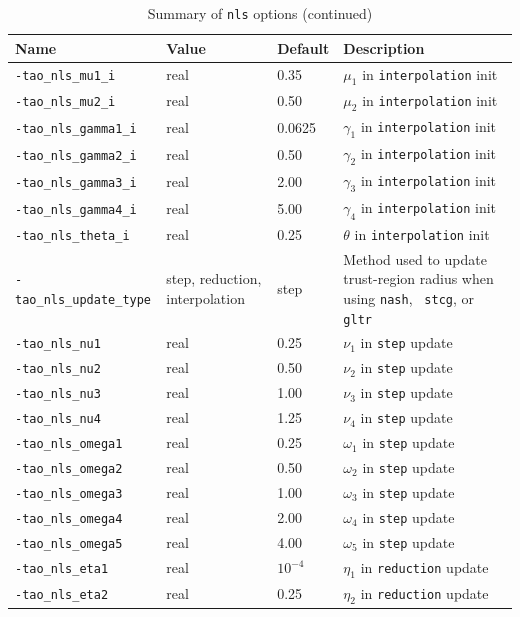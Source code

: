 \documentclass[]{book}
\begin{document}
\begin{table}[h]
\caption{Summary of {\tt nls} options (continued)}
\vspace{5mm}
\begin{tabular}{l|p{1.5in}|l|p{2.0in}}
\hline
Name \rule{0pt}{2.6ex} & Value & Default & Description \\
\hline
{\tt -tao\_nls\_mu1\_i} \rule{0pt}{2.6ex} & real & 0.35 & $\mu_1$ in {\tt interpolation} init \\
{\tt -tao\_nls\_mu2\_i} & real & 0.50 & $\mu_2$ in {\tt interpolation} init \\
{\tt -tao\_nls\_gamma1\_i} & real & 0.0625 & $\gamma_1$ in {\tt interpolation} init \\
{\tt -tao\_nls\_gamma2\_i} & real & 0.50 & $\gamma_2$ in {\tt interpolation} init \\
{\tt -tao\_nls\_gamma3\_i} & real & 2.00 & $\gamma_3$ in {\tt interpolation} init \\
{\tt -tao\_nls\_gamma4\_i} & real & 5.00 & $\gamma_4$ in {\tt interpolation} init \\
{\tt -tao\_nls\_theta\_i} & real & 0.25 & $\theta$ in {\tt interpolation} init \\
{\tt -tao\_nls\_update\_type} & step, reduction, interpolation & step &
Method used to update trust-region radius when using {\tt nash}, {\tt
stcg}, or {\tt gltr} \\
{\tt -tao\_nls\_nu1} & real & 0.25 & $\nu_1$ in {\tt step} update \\
{\tt -tao\_nls\_nu2} & real & 0.50 & $\nu_2$ in {\tt step} update \\
{\tt -tao\_nls\_nu3} & real & 1.00 & $\nu_3$ in {\tt step} update \\
{\tt -tao\_nls\_nu4} & real & 1.25 & $\nu_4$ in {\tt step} update \\
{\tt -tao\_nls\_omega1} & real & 0.25 & $\omega_1$ in {\tt step} update \\
{\tt -tao\_nls\_omega2} & real & 0.50 & $\omega_2$ in {\tt step} update \\
{\tt -tao\_nls\_omega3} & real & 1.00 & $\omega_3$ in {\tt step} update \\
{\tt -tao\_nls\_omega4} & real & 2.00 & $\omega_4$ in {\tt step} update \\
{\tt -tao\_nls\_omega5} & real & 4.00 & $\omega_5$ in {\tt step} update \\
{\tt -tao\_nls\_eta1} & real & $10^{-4}$ & $\eta_1$ in {\tt reduction} update \\
{\tt -tao\_nls\_eta2} & real & 0.25 & $\eta_2$ in {\tt reduction} update \\

\end{tabular}
\end{table}
\end{document}

